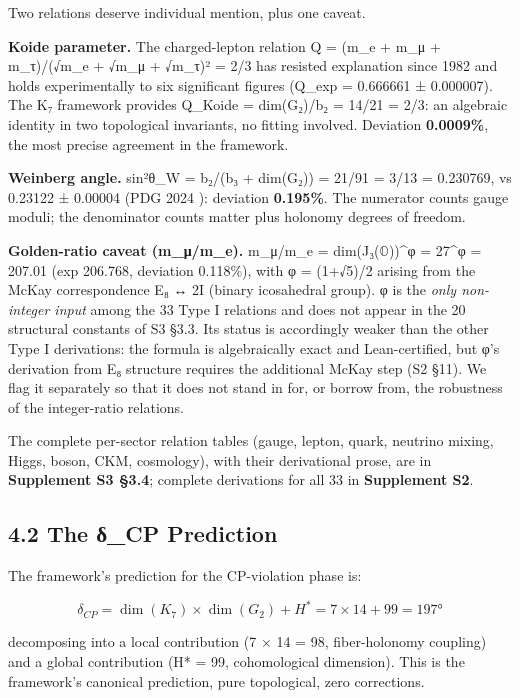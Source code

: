 \documentclass[11pt,a4paper]{article}
\begin{document}
Two relations deserve individual mention, plus one caveat.

\textbf{Koide parameter.} The charged-lepton relation Q = (m\_\allowbreak{}e + m\_\allowbreak{}μ + m\_\allowbreak{}τ)/(√m\_\allowbreak{}e + √m\_\allowbreak{}μ + √m\_\allowbreak{}τ)² = 2/3 has resisted explanation since 1982 \cite{6} and holds experimentally to six significant figures (Q\_\allowbreak{}exp = 0.666661 ± 0.000007). The K₇ framework provides Q\_\allowbreak{}Koide = dim(G₂)/b₂ = 14/21 = 2/3: an algebraic identity in two topological invariants, no fitting involved. Deviation \textbf{0.0009\%}, the most precise agreement in the framework.

\textbf{Weinberg angle.} sin²θ\_\allowbreak{}W = b₂/(b₃ + dim(G₂)) = 21/91 = 3/13 = 0.230769, vs 0.23122 ± 0.00004 (PDG 2024 \cite{1}): deviation \textbf{0.195\%}. The numerator counts gauge moduli; the denominator counts matter plus holonomy degrees of freedom.

\textbf{Golden-ratio caveat (m\_\allowbreak{}μ/m\_\allowbreak{}e).} m\_\allowbreak{}μ/m\_\allowbreak{}e = dim(J₃(\ensuremath{\mathbb{O}}))\^{}φ = 27\^{}φ = 207.01 (exp 206.768, deviation 0.118\%), with φ = (1+√5)/2 arising from the McKay correspondence E₈ ↔ 2I (binary icosahedral group). φ is the \emph{only non-integer input} among the 33 Type I relations and does not appear in the 20 structural constants of S3 §3.3. Its status is accordingly weaker than the other Type I derivations: the formula is algebraically exact and Lean-certified, but φ's derivation from E₈ structure requires the additional McKay step (S2 §11). We flag it separately so that it does not stand in for, or borrow from, the robustness of the integer-ratio relations.

The complete per-sector relation tables (gauge, lepton, quark, neutrino mixing, Higgs, boson, CKM, cosmology), with their derivational prose, are in \textbf{Supplement S3 §3.4}; complete derivations for all 33 in \textbf{Supplement S2}.

\subsection{4.2 The δ\_\allowbreak{}CP Prediction}\label{the-ux3b4_cp-prediction}

The framework's prediction for the CP-violation phase is:

\[\delta_{CP} = \dim(K_7) \times \dim(G_2) + H^* = 7 \times 14 + 99 = 197°\]

decomposing into a local contribution (7 × 14 = 98, fiber-holonomy coupling) and a global contribution (H* = 99, cohomological dimension). This is the framework's canonical prediction, pure topological, zero corrections.
\end{document}
